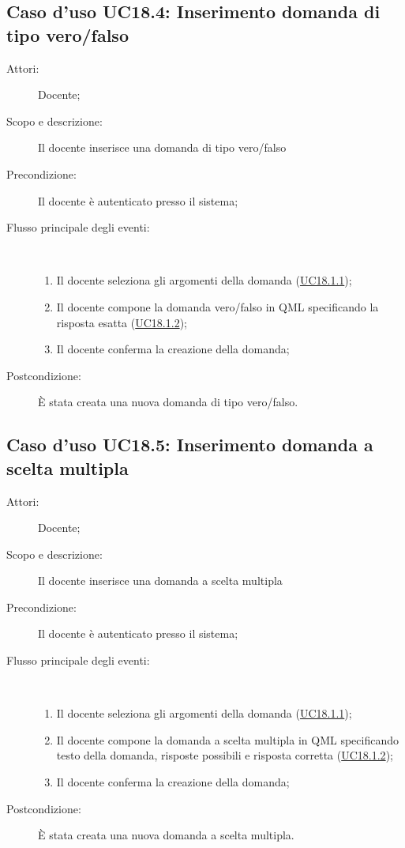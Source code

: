 \subsection{Caso d'uso UC18.4: Inserimento domanda di tipo vero/falso}\begin{description}
	\item[Attori:] Docente;
	\item[Scopo e descrizione:] Il docente inserisce una domanda di tipo vero/falso
	\item[Precondizione:] Il docente è autenticato presso il sistema;
	
	\item[Flusso principale degli eventi:] \ 
	\begin{enumerate}
		\item Il docente seleziona gli argomenti della domanda (\hyperlink{UC18.1.1}{UC18.1.1});
		\item Il docente compone la domanda vero/falso in QML specificando la risposta esatta (\hyperlink{UC18.1.2}{UC18.1.2});
		\item Il docente conferma la creazione della domanda;
		
	\end{enumerate}
	\item[Postcondizione:] È stata creata una nuova domanda di tipo vero/falso.
\end{description}
\hypertarget{UC18.5}{}
\subsection{Caso d'uso UC18.5: Inserimento domanda a scelta multipla}\begin{description}
	\item[Attori:] Docente;
	\item[Scopo e descrizione:] Il docente inserisce una domanda a scelta multipla
	\item[Precondizione:] Il docente è autenticato presso il sistema;
	
	\item[Flusso principale degli eventi:] \ 
	\begin{enumerate}
		\item Il docente seleziona gli argomenti della domanda (\hyperlink{UC18.1.1}{UC18.1.1});
		\item Il docente compone la domanda a scelta multipla in QML specificando testo della domanda, risposte possibili e risposta corretta (\hyperlink{UC18.1.2}{UC18.1.2});
		\item Il docente conferma la creazione della domanda;
		
	\end{enumerate}
	\item[Postcondizione:] È stata creata una nuova domanda a scelta multipla.
\end{description}
\hypertarget{UC18.6}{}
